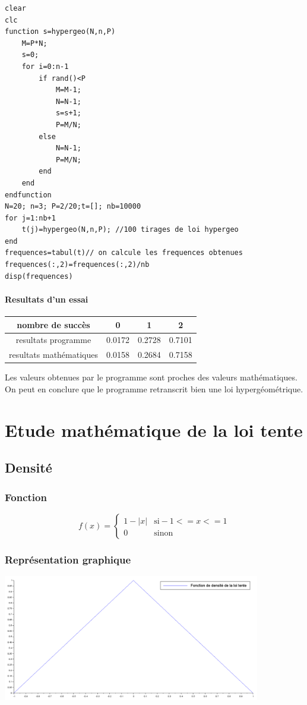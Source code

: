 \documentclass{article}
\begin{document}
\begin{verbatim}
clear
clc
function s=hypergeo(N,n,P)
    M=P*N;
    s=0;
    for i=0:n-1
        if rand()<P
            M=M-1;
            N=N-1;
            s=s+1;
            P=M/N;
        else
            N=N-1;
            P=M/N;
        end         
    end
endfunction
N=20; n=3; P=2/20;t=[]; nb=10000
for j=1:nb+1
    t(j)=hypergeo(N,n,P); //100 tirages de loi hypergeo
end
frequences=tabul(t)// on calcule les frequences obtenues
frequences(:,2)=frequences(:,2)/nb
disp(frequences)
\end{verbatim}

\paragraph{Resultats d'un essai}
\begin{center}
\begin{tabular}{cccc}
nombre de succès & 0 & 1 & 2 \\
\hline
resultats programme & 0.0172 & 0.2728 & 0.7101 \\
\hline
resultats mathématiques & 0.0158 & 0.2684 & 0.7158 \\
\hline
\end{tabular}
\end{center}
Les valeurs obtenues par le programme sont proches des valeurs mathématiques. On peut en conclure que le programme retranscrit bien une loi hypergéométrique.

\section{Etude mathématique de la loi tente}

\subsection{Densité}

\subsubsection{Fonction}

$$
f(x)=\left\{
	\begin{array}{ll}
		1-|x| & \mbox{si} -1<=x<=1\\
		0 & \mbox{sinon}
	\end{array}
\right.
$$

\subsubsection{Représentation graphique}
\begin{center}
\includegraphics[width=425px]{img/tente.png}
\end{center}
\end{document}
